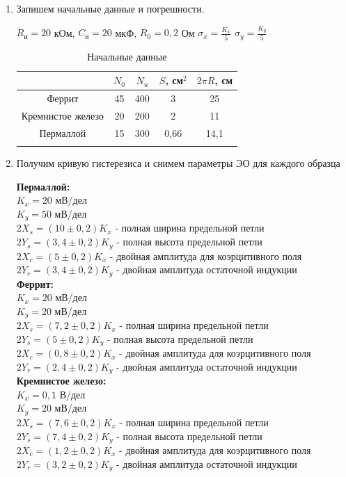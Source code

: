 \documentclass[a4paper, 12pt]{article}%
\begin{document}
	\begin{enumerate}
		
	\item Запишем начальные данные и погрешности.
	
	$R_{\text{и}} = 20$ кОм,				
	$C_{\text{и}} = 20$ мкФ,				
	$ R_0 = 0,2$ Ом
	$\sigma_x = \frac{K_x}{5}$
	$\sigma_y = \frac{K_y}{5}$
	
			\begin{longtable} {|c|c|c|c|c|}
			\hline
			  & $N_0$ &  $ N_u $ & $ S $, см$^2$ & $2\pi R$, см      \\ \hline
			Феррит & 45 & 400 & 3 & 25\\ \hline
			Кремнистое железо & 20  & 200 &  2  & 11   \\ \hline
			Пермаллой & 15 & 300&  0,66   &  14,1 \\ \hline
			\caption{Начальные данные}
		\end{longtable}
		
		
	\item Получим кривую гистерезиса и снимем параметры ЭО для каждого образца
	
	\textbf{Пермаллой: }\\
	$K_x = 20$ мВ/дел\\
	$K_y = 50$ мВ/дел\\
	$2X_s = (10\pm0,2)K_x$ - полная ширина предельной петли\\
	$2Y_s = (3,4\pm0,2)K_y$	- полная высота предельной петли\\
	$2X_c = (5\pm0,2)K_x$ - двойная амплитуда для коэрцитивного поля\\
	$2Y_r = (3,4\pm0,2)K_y$	- двойная амплитуда остаточной индукции\\
	
	\textbf{Феррит: }\\
	$K_x = 20$ мВ/дел\\
	$K_y = 20$ мВ/дел\\
	$2X_s = (7,2\pm0,2)K_x$ - полная ширина предельной петли\\
	$2Y_s = (5\pm0,2)K_y$	- полная высота предельной петли\\
	$2X_c = (0,8\pm0,2)K_x$ - двойная амплитуда для коэрцитивного поля\\
	$2Y_r = (2,4\pm0,2)K_y$	- двойная амплитуда остаточной индукции\\
	\textbf{Кремнистое железо: }\\
	$K_x = 0,1$ В/дел\\
	$K_y = 20$ мВ/дел\\
	$2X_s = (7,6\pm0,2)K_x$ - полная ширина предельной петли\\
	$2Y_s = (7,4\pm0,2)K_y$	- полная высота предельной петли\\
	$2X_c = (1,2\pm0,2)K_x$ - двойная амплитуда для коэрцитивного поля\\
	$2Y_r = (3,2\pm0,2)K_y$	- двойная амплитуда остаточной индукции\\
	

\end{enumerate}
\end{document}
